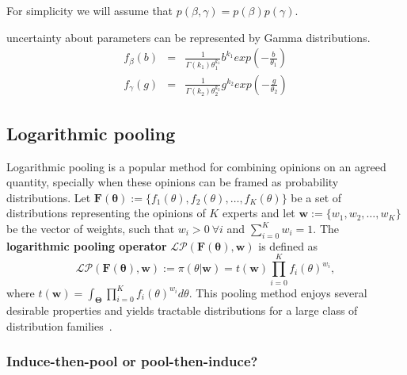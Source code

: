 \documentclass[11pt]{article}
\begin{document}
For simplicity we will assume that $p(\beta, \gamma) = p(\beta)p(\gamma)$.

uncertainty about parameters can be represented by Gamma distributions.
\begin{eqnarray*}
f_{\beta}(b) &=& \frac{1}{\Gamma(k_1)\theta_1^{k_1}} b^{k_1} exp (- \frac{b}{\theta_1} ) \\
f_{\gamma}(g) &=& \frac{1}{\Gamma(k_2)\theta_2^{k_2}} g^{k_2} exp (- \frac{g}{\theta_2})
\end{eqnarray*}

\subsection{Logarithmic pooling} 

Logarithmic pooling is a popular method for combining opinions on an agreed quantity, specially when these opinions can be framed as probability distributions.
Let $\mathbf{F(\theta)} := \{f_1(\theta), f_2(\theta), \ldots, f_K(\theta)\}$ be a set of distributions representing the opinions of $K$ experts and let $\mathbf{w} :=\{w_1, w_2, \ldots, w_K \}$ be the vector of weights, such that $w_i > 0\: \forall i$ and $\sum_{i=0}^K w_i = 1$.
The \textbf{logarithmic pooling operator} $\mathcal{LP}(\mathbf{F(\theta)}, \mathbf{w})$ is defined as
\begin{equation}
\label{eq:logpool}
 \mathcal{LP}(\mathbf{F(\theta)}, \mathbf{w}) :=  \pi(\theta | \mathbf{w}) = t(\mathbf{w}) \prod_{i=0}^K f_i(\theta)^{w_i},
\end{equation}
where $t(\mathbf{w}) = \int_{\boldsymbol\Theta}\prod_{i=0}^K f_i(\theta)^{w_i}d\theta$.
This pooling method enjoys several desirable properties and yields tractable distributions for a large class of distribution families~\citep{genest1984, carvalho2016}.

\subsubsection{Induce-then-pool or pool-then-induce?}
\end{document}

